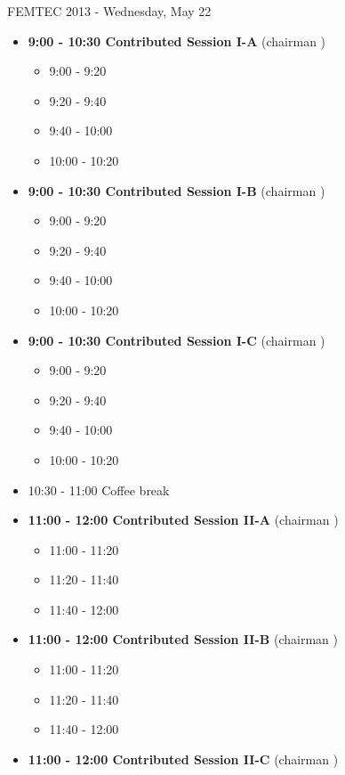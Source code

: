 \documentclass[10pt, A4]{article}
\begin{document}
\centerline{\huge FEMTEC 2013 - Wednesday, May 22}
\vspace{4mm}

\begin{itemize}    
  \item {\bf 9:00 - 10:30 Contributed Session I-A} (chairman ) 
  \begin{itemize}
    \item 9:00 - 9:20 
    \item 9:20 - 9:40 
    \item 9:40 - 10:00 
    \item 10:00 - 10:20  
  \end{itemize}
  \item {\bf 9:00 - 10:30 Contributed Session I-B} (chairman ) 
  \begin{itemize}
    \item 9:00 - 9:20 
    \item 9:20 - 9:40 
    \item 9:40 - 10:00 
    \item 10:00 - 10:20      
  \end{itemize}
    \item {\bf 9:00 - 10:30 Contributed Session I-C} (chairman ) 
  \begin{itemize}
    \item 9:00 - 9:20 
    \item 9:20 - 9:40 
    \item 9:40 - 10:00 
    \item 10:00 - 10:20      
  \end{itemize}
  \item 10:30 - 11:00 Coffee break
  \item {\bf 11:00 - 12:00 Contributed Session II-A} (chairman ) 
  \begin{itemize}
    \item 11:00 - 11:20 
    \item 11:20 - 11:40 
    \item 11:40 - 12:00 
  \end{itemize}
  \item {\bf 11:00 - 12:00 Contributed Session II-B} (chairman ) 
  \begin{itemize}
    \item 11:00 - 11:20 
    \item 11:20 - 11:40 
    \item 11:40 - 12:00  
  \end{itemize}
  \item {\bf 11:00 - 12:00 Contributed Session II-C} (chairman ) 

\end{itemize}
\end{document}
